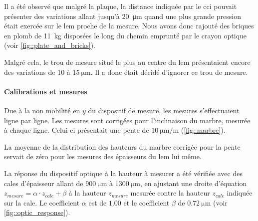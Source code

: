                     
                    
                    Il a été observé que malgré la plaque, la distance indiquée par le \gls{cci} pouvait présenter des variations allant jusqu'à \SI{20}{\micro\meter} quand une plus grande pression était exercée sur le \gls{lem} proche de la mesure. Nous avons donc rajouté des briques en plomb de \SI{11}{\kilo\gram} disposées le long du chemin emprunté par le crayon optique (voir \autoref{fig::plate_and_bricks}). %
                    
                    Malgré cela, le trou de mesure situé le plus au centre du \gls{lem} présentaient encore des variations de $10$ à $\SI{15}{\micro\meter}$. Il a donc était décidé d'ignorer ce trou de mesure.
                    
                \paragraph{Calibrations et mesures}
                
                    Due à la non mobilité en $y$ du dispositif de mesure, les mesures s'effectuaient ligne par ligne. Les mesures sont corrigées pour l'inclinaison du marbre, mesurée à chaque ligne. Celui-ci présentait une pente de $\SI{10}{\micro\meter\per\meter}$ (\autoref{fig::marbre}).
                    
                    La moyenne de la distribution des hauteurs du marbre corrigée pour la pente servait de zéro pour les mesures des épaisseurs du \gls{lem} lui même.
                    
                    La réponse du dispositif optique à la hauteur à mesurer a été vérifiée avec des cales d'épaisseur allant de $\SI{900}{\micro\meter}$ à $\SI{1300}{\micro\meter}$, en ajustant une droite d'équation $z_{mesure} = \alpha \cdot z_{cale} + \beta$ à la hauteur $z_{mesure}$ mesurée contre la hauteur $z_{cale}$ indiquée sur la cale. Le coefficient $\alpha$ est de $1.00$ et le coefficient $\beta$ de $\SI{0.72}{\micro\meter}$ (voir \autoref{fig::optic_response}).
                    
